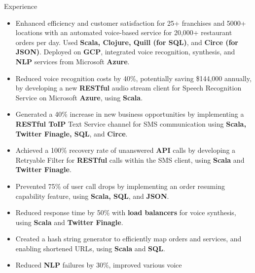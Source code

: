 \documentclass{resume} %
\begin{document}
\begin{workSection}{Experience}
    \experienceItem[
    company=Novo Labs Inc,
    location=Dallas{,} TX,
    position=Software Engineer,
    duration=Feb 2021 – Jun 2023
    ]
    \vspace{-0.65em}
    \begin{itemize}
        \itemsep -6pt {}
        \item Enhanced efficiency and customer satisfaction for 25+ franchises
              and 5000+ locations with an automated voice-based service for
              20,000+
              restaurant orders per day. Used \textbf{Scala, Clojure, Quill
                  (for SQL)},
              and \textbf{Circe (for
                  JSON)}. Deployed on \textbf{GCP}, integrated voice recognition,
              synthesis,
              and \textbf{NLP}
              services from Microsoft \textbf{Azure}.
        \item Reduced voice recognition costs by 40\%, potentially saving
              \$144,000 annually, by developing a new \textbf{RESTful} audio
              stream
              client for Speech
              Recognition Service on Microsoft \textbf{Azure}, using
              \textbf{Scala}.
        \item Generated a 40\% increase in new business opportunities by
              implementing a \textbf{RESTful ToIP} Text Service channel for SMS
              communication using
              \textbf{Scala, Twitter Finagle, SQL}, and \textbf{Circe}.
        \item Achieved a 100\% recovery rate of unanswered \textbf{API} calls
              by
              developing a Retryable Filter for \textbf{RESTful} calls within
              the SMS
              client, using
              \textbf{Scala} and \textbf{Twitter Finagle}.
        \item Prevented 75\% of user call drops by implementing an order
              resuming capability feature, using \textbf{Scala, SQL}, and
              \textbf{JSON}.
        \item Reduced response time by 50\% with \textbf{load
                  balancers} for voice synthesis, using \textbf{Scala} and
              \textbf{Twitter Finagle}.
        \item Created a hash string generator to efficiently map orders and
              services, and enabling shortened URLs, using \textbf{Scala} and
              \textbf{SQL}.
        \item Reduced \textbf{NLP} failures by 30\%, improved various voice

\end{itemize}
\end{workSection}
\end{document}
